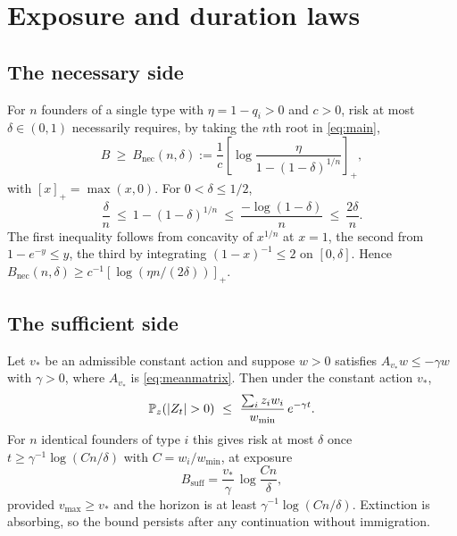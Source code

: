 \section{Exposure and duration laws}
\label{sec:laws}

\subsection{The necessary side}

For $n$ founders of a single type with $\eta=1-q_i>0$ and $c>0$, risk at most
$\delta\in(0,1)$ necessarily requires, by taking the $n$th root in
\eqref{eq:main},
\begin{equation}\label{eq:necessary}
 B\ \ge\ B_{\mathrm{nec}}(n,\delta):=\frac1c
 \left[\log\frac{\eta}{1-(1-\delta)^{1/n}}\right]_+ ,
\end{equation}
with $[x]_+=\max(x,0)$. For $0<\delta\le1/2$,
\begin{equation}\label{eq:rootbounds}
 \frac\delta n\ \le\ 1-(1-\delta)^{1/n}
 \ \le\ \frac{-\log(1-\delta)}n\ \le\ \frac{2\delta}n .
\end{equation}
The first inequality follows from concavity of $x^{1/n}$ at $x=1$, the second
from $1-e^{-y}\le y$, the third by integrating $(1-x)^{-1}\le2$ on $[0,\delta]$.
Hence $B_{\mathrm{nec}}(n,\delta)\ge c^{-1}[\log(\eta n/(2\delta))]_+$.

\subsection{The sufficient side}

\begin{proposition}\label{prop:weight}
Let $v_*$ be an admissible constant action and suppose $w>0$ satisfies
$A_{v_*}w\le-\gamma w$ with $\gamma>0$, where $A_{v_*}$ is
\eqref{eq:meanmatrix}. Then under the constant action $v_*$,
\begin{equation}\label{eq:upper}
 \Prob_z(|Z_t|>0)\ \le\ \frac{\sum_iz_iw_i}{w_{\min}}\,e^{-\gamma t}.
\end{equation}
For $n$ identical founders of type $i$ this gives risk at most $\delta$ once
$t\ge\gamma^{-1}\log(Cn/\delta)$ with $C=w_i/w_{\min}$, at exposure
\begin{equation}\label{eq:sufficient}
 B_{\mathrm{suff}}=\frac{v_*}{\gamma}\,\log\frac{Cn}{\delta},
\end{equation}
provided $v_{\max}\ge v_*$ and the horizon is at least
$\gamma^{-1}\log(Cn/\delta)$. Extinction is absorbing, so the bound persists
after any continuation without immigration.
\end{proposition}

